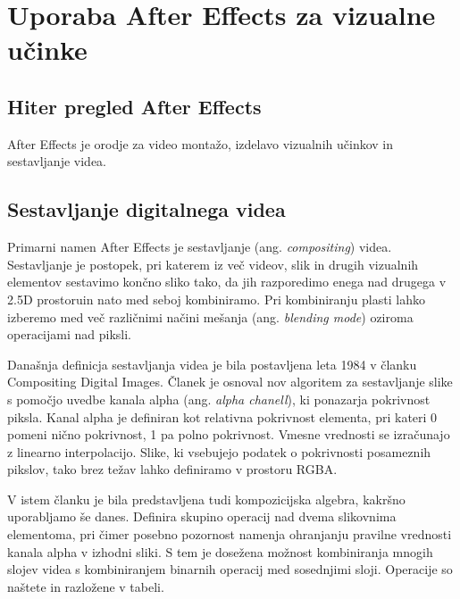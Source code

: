 \documentclass[a4paper, 12pt]{book}
\begin{document}
\chapter{Uporaba After Effects za vizualne učinke}

\section{Hiter pregled After Effects}

After Effects je orodje za video montažo, izdelavo vizualnih učinkov in sestavljanje videa.

\section{Sestavljanje digitalnega videa}

Primarni namen After Effects je sestavljanje (ang. {\it compositing}) videa.
Sestavljanje je postopek, pri katerem iz več videov, slik in drugih vizualnih elementov sestavimo končno sliko tako,
da jih razporedimo enega nad drugega v 2.5D prostoru\footnotemark in nato med seboj kombiniramo\cite{siggraphComposition}.
Pri kombiniranju plasti lahko izberemo med več različnimi načini mešanja (ang. {\it blending mode}) oziroma operacijami nad piksli.

Današnja definicja sestavljanja videa je bila postavljena leta 1984 v članku Compositing Digital Images\cite{siggraphComposition}.
Članek je osnoval nov algoritem za sestavljanje slike s pomočjo uvedbe kanala alpha (ang. {\it alpha chanell}), ki ponazarja pokrivnost piksla.
Kanal alpha je definiran kot relativna pokrivnost elementa, pri kateri 0 pomeni nično pokrivnost, 1 pa polno pokrivnost.
Vmesne vrednosti se izračunajo z linearno interpolacijo.
Slike, ki vsebujejo podatek o pokrivnosti posameznih pikslov, tako brez težav lahko definiramo v prostoru RGBA.

V istem članku je bila predstavljena tudi kompozicijska algebra, kakršno uporabljamo še danes.
Definira skupino operacij nad dvema slikovnima elementoma, pri čimer posebno pozornost namenja ohranjanju pravilne vrednosti kanala alpha v izhodni sliki.
S tem je dosežena možnost kombiniranja mnogih slojev videa s kombiniranjem binarnih operacij med sosednjimi sloji.
Operacije so naštete in razložene v tabeli. 
\end{document}
